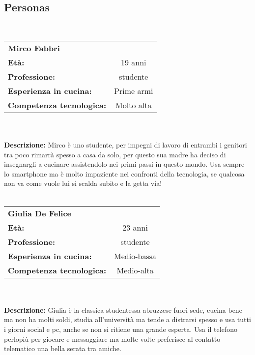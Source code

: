 \subsection{Personas}
\hrulefill\\
\begin{tabular}{l | c}
	\textbf{Mirco Fabbri} & \\
	\textbf{Età:} & 19 anni\\
	\textbf{Professione:} & studente\\
	\textbf{Esperienza in cucina:} & Prime armi\\
	\textbf{Competenza tecnologica:} & Molto alta\\
\end{tabular}\\\\
	\textbf{Descrizione:}  Mirco è uno studente, per impegni di lavoro di
	entrambi i genitori tra poco rimarrà spesso a casa da solo, per questo
	sua madre ha deciso di insegnargli a cucinare assistendolo nei primi
	passi in questo mondo.  Usa sempre lo smartphone ma è molto impaziente
	nei confronti della tecnologia, se qualcosa non va come vuole lui si
	scalda subito e la getta via!\\

\hrulefill\\
\begin{tabular}{l | c}
	\textbf{Giulia De Felice} & \\
	\textbf{Età:} & 23 anni\\
	\textbf{Professione:} & studente\\
	\textbf{Esperienza in cucina:} & Medio-bassa\\
	\textbf{Competenza tecnologica:} & Medio-alta\\
\end{tabular}\\\\
	\textbf{Descrizione:}  Giulia è la classica studentessa abruzzese fuori
	sede, cucina bene ma non ha molti soldi, studia all'università ma tende
	a distrarsi spesso e usa tutti i giorni social e pc, anche se non si
	ritiene una grande esperta.  Usa il telefono perlopiù per giocare e
	messaggiare ma molte volte preferisce al contatto telematico una bella
	serata tra amiche.\\

